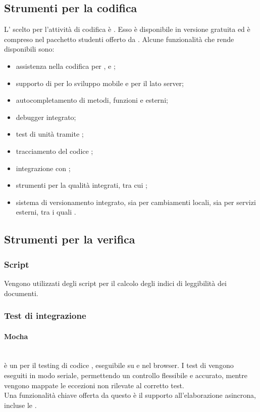\subsection{Strumenti per la codifica}
L' scelto per l'attività di codifica è \textbf{}. Esso è disponibile in versione gratuita ed è compreso nel pacchetto studenti offerto da . Alcune funzionalità che rende disponibili sono:
\begin{itemize}
	\item assistenza nella codifica per ,  e ;
	\item supporto di  per lo sviluppo mobile e  per il lato server;
	\item autocompletamento di metodi, funzioni e  esterni;
	\item debugger integrato;
	\item test di unità tramite ;
	\item tracciamento del codice ;
	\item integrazione con ;
	\item strumenti per la qualità integrati, tra cui ;
	\item sistema di versionamento integrato, sia per cambiamenti locali, sia per servizi esterni, tra i quali .
\end{itemize}

\subsection{Strumenti per la verifica}
\subsubsection{Script}
Vengono utilizzati degli script per il calcolo degli indici di leggibilità dei documenti.

\subsubsection{Test di integrazione}
\paragraph{Mocha}\mbox{}\\
 è un  per il testing di codice , eseguibile su  e nel browser. I test di  vengono eseguiti in modo seriale, permettendo un controllo flessibile e accurato, mentre vengono mappate le eccezioni non rilevate al corretto test.\\
Una funzionalità chiave offerta da questo  è il supporto all’elaborazione asincrona, incluse le .

